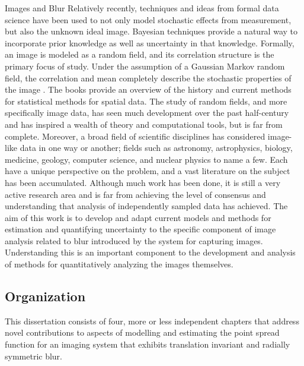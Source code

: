 \begin{chapter}{Images and Blur}
Relatively recently, techniques and ideas from formal data science have been used to not only model stochastic effects from measurement, but also the unknown ideal image. 
Bayesian techniques provide a natural way to incorporate prior knowledge as well as uncertainty in that knowledge.
Formally, an image is modeled as a random field, and its correlation structure is the primary focus of study.
Under the assumption of a Gaussian Markov random field, the correlation and mean completely describe the stochastic properties of the image \citep{rue2005gaussian}.
The books \citep{cressie1993statistics,rue2005gaussian} provide an overview of the history and current methods for statistical methods for spatial data.
The study of random fields, and more specifically image data, has seen much development over the past half-century and has inspired a wealth of theory and computational tools, but is far from complete.
Moreover, a broad field of scientific disciplines has considered image-like data in one way or another; fields such as astronomy, astrophysics, biology, medicine, geology, computer science, and nuclear physics to name a few.
Each have a unique perspective on the problem, and a vast literature on the subject has been accumulated.
Although much work has been done, it is still a very active research area and is far from achieving the level of consensus and understanding that analysis of independently sampled data has achieved. 
The aim of this work is to develop and adapt current models and methods for estimation and quantifying uncertainty to the specific component of image analysis related to blur introduced by the system for capturing images.
Understanding this is an important component to the development and analysis of methods for quantitatively analyzing the images themselves.

\subsection{Organization}
This dissertation consists of four, more or less independent chapters that address novel contributions to aspects of modelling and estimating the point spread function for an imaging system that exhibits translation invariant and radially symmetric blur.


\end{chapter}
